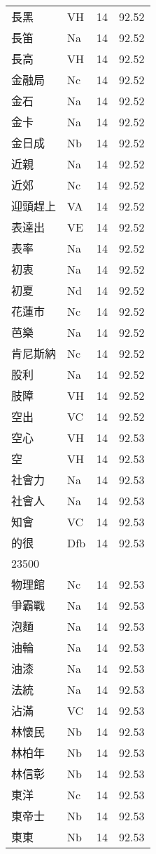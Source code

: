 \documentclass[twocolumn]{book}
\begin{document}
\begin{supertabular}{llrr}
長黑 & VH & 14 &  92.52\\
長笛 & Na & 14 &  92.52\\
長高 & VH & 14 &  92.52\\
金融局 & Nc & 14 &  92.52\\
金石 & Na & 14 &  92.52\\
金卡 & Na & 14 &  92.52\\
金日成 & Nb & 14 &  92.52\\
近親 & Na & 14 &  92.52\\
近郊 & Nc & 14 &  92.52\\
迎頭趕上 & VA & 14 &  92.52\\
表達出 & VE & 14 &  92.52\\
表率 & Na & 14 &  92.52\\
初衷 & Na & 14 &  92.52\\
初夏 & Nd & 14 &  92.52\\
花蓮市 & Nc & 14 &  92.52\\
芭樂 & Na & 14 &  92.52\\
肯尼斯納 & Nc & 14 &  92.52\\
股利 & Na & 14 &  92.52\\
肢障 & VH & 14 &  92.52\\
空出 & VC & 14 &  92.52\\
空心 & VH & 14 &  92.53\\
空 & VH & 14 &  92.53\\
社會力 & Na & 14 &  92.53\\
社會人 & Na & 14 &  92.53\\
知會 & VC & 14 &  92.53\\
的很 & Dfb & 14 &  92.53\\
23500\\
物理館 & Nc & 14 &  92.53\\
爭霸戰 & Na & 14 &  92.53\\
泡麵 & Na & 14 &  92.53\\
油輪 & Na & 14 &  92.53\\
油漆 & Na & 14 &  92.53\\
法統 & Na & 14 &  92.53\\
沾滿 & VC & 14 &  92.53\\
林懷民 & Nb & 14 &  92.53\\
林柏年 & Nb & 14 &  92.53\\
林信彰 & Nb & 14 &  92.53\\
東洋 & Nc & 14 &  92.53\\
東帝士 & Nb & 14 &  92.53\\
東東 & Nb & 14 &  92.53\\

\end{supertabular}
\end{document}
